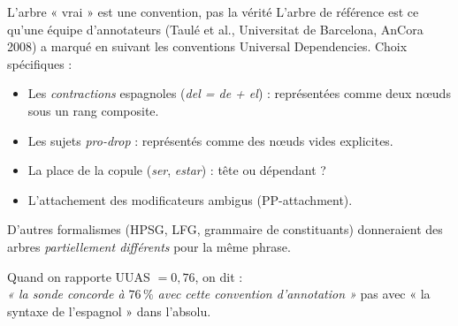 \documentclass[aspectratio=169,11pt]{beamer}
\begin{document}
\begin{frame}{L'arbre « vrai » est une convention, pas la v\'erit\'e}
  \vspace{0.2cm}
  L'arbre de r\'ef\'erence est ce qu'une \'equipe d'annotateurs
  (Taul\'e et al., Universitat de Barcelona, AnCora 2008) a marqu\'e en
  suivant les conventions \alert{Universal Dependencies}. Choix sp\'ecifiques :

  \vspace{0.3cm}
  \begin{itemize}\setlength\itemsep{4pt}
    \item Les \emph{contractions} espagnoles
          (\textit{del = de + el}) : repr\'esent\'ees comme deux n\oe{}uds
          sous un rang composite.
    \item Les sujets \emph{pro-drop} : repr\'esent\'es comme des
          n\oe{}uds vides explicites.
    \item La place de la copule (\textit{ser}, \textit{estar}) :
          t\^ete ou d\'ependant ?
    \item L'attachement des modificateurs ambigus (PP-attachment).
  \end{itemize}

  \vspace{0.4cm}
  D'autres formalismes (HPSG, LFG, grammaire de constituants) donneraient
  des arbres \emph{partiellement diff\'erents} pour la m\^eme phrase.

  \vspace{0.4cm}
  \centering
  \alert{Quand on rapporte UUAS $= 0{,}76$, on dit :}\\[2pt]
  \emph{« la sonde concorde \`a $76\,\%$ avec cette convention
  d'annotation »} \textemdash{} pas avec « la syntaxe de
  l'espagnol » dans l'absolu.
\end{frame}
\end{document}

